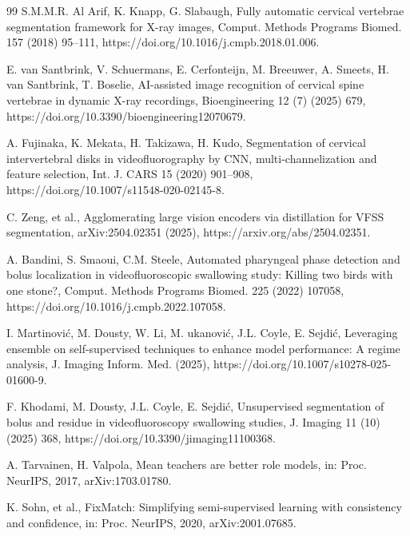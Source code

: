 \documentclass[a4paper,fleqn]{cas-dc}
\begin{document}
\begin{thebibliography}{99}
S.M.M.R. Al Arif, K. Knapp, G. Slabaugh,
Fully automatic cervical vertebrae segmentation framework for X-ray images,
Comput. Methods Programs Biomed. 157 (2018) 95--111, https://doi.org/10.1016/j.cmpb.2018.01.006.

E. van Santbrink, V. Schuermans, E. Cerfonteijn, M. Breeuwer, A. Smeets, H. van Santbrink, T. Boselie,
AI-assisted image recognition of cervical spine vertebrae in dynamic X-ray recordings,
Bioengineering 12 (7) (2025) 679, https://doi.org/10.3390/bioengineering12070679.

A. Fujinaka, K. Mekata, H. Takizawa, H. Kudo,
Segmentation of cervical intervertebral disks in videofluorography by CNN, multi-channelization and feature selection,
Int. J. CARS 15 (2020) 901--908, https://doi.org/10.1007/s11548-020-02145-8.

C. Zeng, et al.,
Agglomerating large vision encoders via distillation for VFSS segmentation,
arXiv:2504.02351 (2025), https://arxiv.org/abs/2504.02351.

A. Bandini, S. Smaoui, C.M. Steele,
Automated pharyngeal phase detection and bolus localization in 
videofluoroscopic swallowing study: Killing two birds with one stone?,
Comput. Methods Programs Biomed. 225 (2022) 107058, https://doi.org/10.1016/j.cmpb.2022.107058.

I. Martinovi\'{c}, M. Dousty, W. Li, M. {\DJ}ukanovi\'{c}, J.L. Coyle, E. Sejdi\'{c},
Leveraging ensemble on self-supervised techniques to enhance model performance: A regime analysis,
J. Imaging Inform. Med. (2025), https://doi.org/10.1007/s10278-025-01600-9.

F. Khodami, M. Dousty, J.L. Coyle, E. Sejdi\'{c},
Unsupervised segmentation of bolus and residue in videofluoroscopy swallowing studies,
J. Imaging 11 (10) (2025) 368, https://doi.org/10.3390/jimaging11100368.

A. Tarvainen, H. Valpola,
Mean teachers are better role models,
in: Proc. NeurIPS, 2017, arXiv:1703.01780.

K. Sohn, et al.,
FixMatch: Simplifying semi-supervised learning with consistency and confidence,
in: Proc. NeurIPS, 2020, arXiv:2001.07685.


\end{thebibliography}
\end{document}
